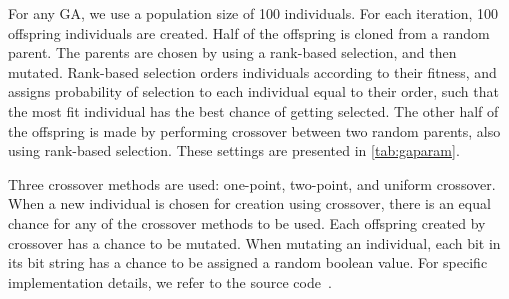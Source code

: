 For any GA, we use a population size of \num{100} individuals. For each iteration, \num{100} offspring individuals are created. Half of the offspring is cloned from a random parent. The parents are chosen by using a rank-based selection, and then mutated. Rank-based selection orders individuals according to their fitness, and assigns probability of selection to each individual equal to their order, such that the most fit individual has the best chance of getting selected. The other half of the offspring is made by performing crossover between two random parents, also using rank-based selection. These settings are presented in \cref{tab:gaparam}.

Three crossover methods are used: one-point, two-point, and uniform crossover. When a new individual is chosen for creation using crossover, there is an equal chance for any of the crossover methods to be used. Each offspring created by crossover has a  chance to be mutated. When mutating an individual, each bit in its bit string has a  chance to be assigned a random boolean value. For specific implementation details, we refer to the source code~\cite{mbm:kmc:ekoGA}.




